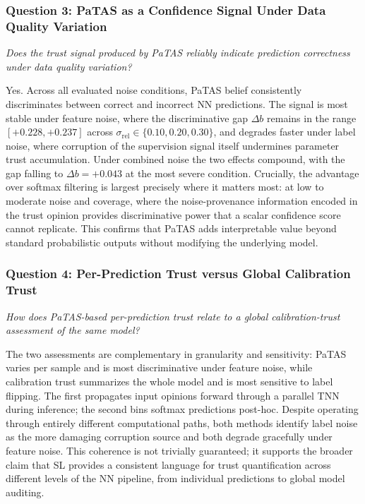 \subsubsection*{Question 3: \ac{PaTAS} as a Confidence Signal Under Data 
Quality Variation}

\emph{Does the trust signal produced by \ac{PaTAS} reliably indicate 
prediction correctness under data quality variation?}

Yes. Across all evaluated noise conditions, \ac{PaTAS} belief consistently discriminates between correct and incorrect \ac{NN} predictions. The signal is most stable under feature noise, where the discriminative gap $\Delta b$ remains in the range $[+0.228, +0.237]$ across $\sigma_{\text{rel}} \in \{0.10, 0.20, 0.30\}$, and degrades faster under label noise, where corruption of the supervision signal itself undermines parameter trust accumulation. Under combined noise the two effects compound, with the gap falling to $\Delta b = +0.043$ at the most severe condition. Crucially, the advantage over softmax filtering is largest precisely where it matters most: at low to moderate noise and coverage, where the noise-provenance information encoded in the trust opinion provides discriminative power that a scalar confidence score cannot replicate. This confirms that \ac{PaTAS} adds interpretable value beyond standard probabilistic outputs without modifying the underlying model.


\subsubsection*{Question 4: Per-Prediction Trust versus Global Calibration 
Trust}

\emph{How does \ac{PaTAS}-based per-prediction trust relate to a global calibration-trust assessment of the same model?}



The two assessments are complementary in granularity and sensitivity: \ac{PaTAS} varies per sample and is most discriminative under feature noise, while calibration trust summarizes the whole model and is most sensitive to label flipping. The first propagates input opinions forward through a parallel \ac{TNN} during inference; the second bins softmax predictions post-hoc. Despite operating through entirely different computational paths, both methods identify label noise as the more damaging corruption source and both degrade gracefully under feature noise. This coherence is not trivially guaranteed; it supports the broader claim that \ac{SL} provides a consistent language for trust quantification across different levels of the \ac{NN} pipeline, from individual predictions to global model auditing.

